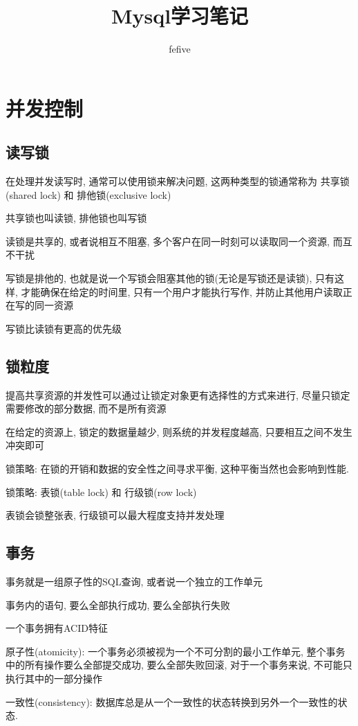 \documentclass[UTF8]{ctexart}
\title{Mysql学习笔记}
\author{fefive}
\begin{document}
\maketitle
\section{并发控制}
\subsection{读写锁}
在处理并发读写时, 通常可以使用锁来解决问题, 这两种类型的锁通常称为  共享锁(shared lock) 和  排他锁(exclusive lock)

共享锁也叫读锁, 排他锁也叫写锁

读锁是共享的, 或者说相互不阻塞, 多个客户在同一时刻可以读取同一个资源, 而互不干扰

写锁是排他的, 也就是说一个写锁会阻塞其他的锁(无论是写锁还是读锁), 只有这样, 才能确保在给定的时间里, 只有一个用户才能执行写作, 并防止其他用户读取正在写的同一资源

写锁比读锁有更高的优先级

\subsection{锁粒度}
提高共享资源的并发性可以通过让锁定对象更有选择性的方式来进行, 尽量只锁定需要修改的部分数据, 而不是所有资源

在给定的资源上, 锁定的数据量越少, 则系统的并发程度越高, 只要相互之间不发生冲突即可

锁策略: 在锁的开销和数据的安全性之间寻求平衡, 这种平衡当然也会影响到性能.

锁策略: 表锁(table lock) 和 行级锁(row lock)

表锁会锁整张表, 行级锁可以最大程度支持并发处理

\subsection{事务}
事务就是一组原子性的SQL查询, 或者说一个独立的工作单元

事务内的语句, 要么全部执行成功, 要么全部执行失败

一个事务拥有ACID特征

原子性(atomicity): 一个事务必须被视为一个不可分割的最小工作单元, 整个事务中的所有操作要么全部提交成功, 要么全部失败回滚, 对于一个事务来说, 不可能只执行其中的一部分操作

一致性(consistency): 数据库总是从一个一致性的状态转换到另外一个一致性的状态.
\end{document}
